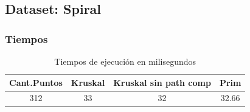 \documentclass[11pt,a4paper]{article}
\begin{document}
\subsection{Dataset: Spiral}
\subsubsection{Tiempos}
\begin{table}[ht]
\caption{Tiempos de ejecución en milisegundos} %
\centering %
\begin{tabular}{c c c c} %
\hline\hline %
Cant.Puntos & Kruskal & Kruskal sin path comp & Prim \\ [0.5ex] %
\hline %
312 & 33 & 32 & 32.66 \\ [1ex] %
\hline %
\end{tabular}
\label{table:nonlin} %
\end{table} 
\end{document}
